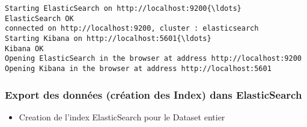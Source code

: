 \documentclass[11pt]{article}
\providecommand{\tightlist}{%
      \setlength{\itemsep}{0pt}\setlength{\parskip}{0pt}}
\begin{document}
    \begin{Verbatim}[commandchars=\\\{\}]
Starting ElasticSearch on http://localhost:9200{\ldots}
ElasticSearch OK
connected on http://localhost:9200, cluster : elasticsearch
Starting Kibana on http://localhost:5601{\ldots}
Kibana OK
Opening ElasticSearch in the browser at address http://localhost:9200
Opening Kibana in the browser at address http://localhost:5601

    \end{Verbatim}

    \hypertarget{export-des-donnuxe9es-cruxe9ation-des-index-dans-elasticsearch}{%
\subsubsection{Export des données (création des Index) dans
ElasticSearch}\label{export-des-donnuxe9es-cruxe9ation-des-index-dans-elasticsearch}}

    \begin{itemize}
\tightlist
\item
  Creation de l'index ElasticSearch pour le Dataset entier
\end{itemize}
\end{document}
